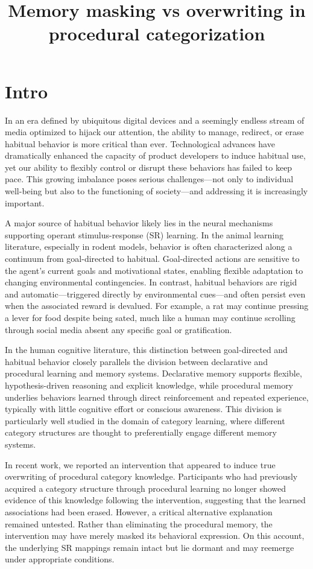\documentclass{article}
\title{Memory masking vs overwriting in procedural categorization}
\author{}
\date{}
\begin{document}
\maketitle

\section{Intro}
In an era defined by ubiquitous digital devices and a
seemingly endless stream of media optimized to hijack our
attention, the ability to manage, redirect, or erase
habitual behavior is more critical than ever. Technological
advances have dramatically enhanced the capacity of product
developers to induce habitual use, yet our ability to
flexibly control or disrupt these behaviors has failed to
keep pace. This growing imbalance poses serious
challenges—not only to individual well-being but also to the
functioning of society—and addressing it is increasingly
important.

A major source of habitual behavior likely lies in the
neural mechanisms supporting operant stimulus-response (SR)
learning. In the animal learning literature, especially in
rodent models, behavior is often characterized along a
continuum from goal-directed to habitual. Goal-directed
actions are sensitive to the agent’s current goals and
motivational states, enabling flexible adaptation to
changing environmental contingencies. In contrast, habitual
behaviors are rigid and automatic—triggered directly by
environmental cues—and often persist even when the
associated reward is devalued. For example, a rat may
continue pressing a lever for food despite being sated, much
like a human may continue scrolling through social media
absent any specific goal or gratification.

In the human cognitive literature, this distinction between
goal-directed and habitual behavior closely parallels the
division between declarative and procedural learning and
memory systems. Declarative memory supports flexible,
hypothesis-driven reasoning and explicit knowledge, while
procedural memory underlies behaviors learned through direct
reinforcement and repeated experience, typically with little
cognitive effort or conscious awareness. This division is
particularly well studied in the domain of category
learning, where different category structures are thought to
preferentially engage different memory systems.

In recent work, we reported an intervention that appeared to
induce true overwriting of procedural category knowledge.
Participants who had previously acquired a category
structure through procedural learning no longer showed
evidence of this knowledge following the intervention,
suggesting that the learned associations had been erased.
However, a critical alternative explanation remained
untested. Rather than eliminating the procedural memory, the
intervention may have merely masked its behavioral
expression. On this account, the underlying SR mappings
remain intact but lie dormant and may reemerge under
appropriate conditions.
\end{document}
